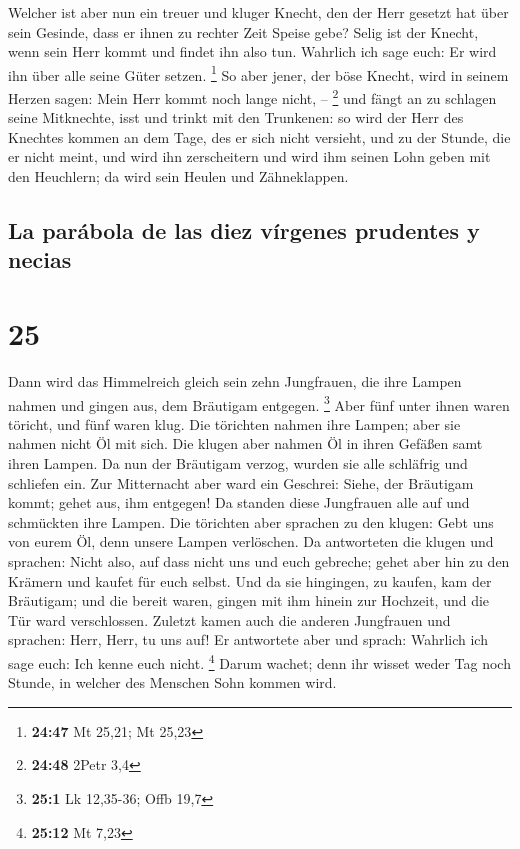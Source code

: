 Welcher ist aber nun ein treuer und kluger Knecht, den
der Herr gesetzt hat über sein Gesinde, dass er ihnen zu rechter Zeit
Speise gebe?  Selig ist der Knecht, wenn sein Herr kommt
und findet ihn also tun.  Wahrlich ich sage euch: Er wird
ihn über alle seine Güter setzen. \footnote{\textbf{24:47} Mt 25,21; Mt
  25,23}  So aber jener, der böse Knecht, wird in seinem
Herzen sagen: Mein Herr kommt noch lange nicht, -- \footnote{\textbf{24:48}
  2Petr 3,4}  und fängt an zu schlagen seine Mitknechte,
isst und trinkt mit den Trunkenen:  so wird der Herr des
Knechtes kommen an dem Tage, des er sich nicht versieht, und zu der
Stunde, die er nicht meint,  und wird ihn zerscheitern
und wird ihm seinen Lohn geben mit den Heuchlern; da wird sein Heulen
und Zähneklappen.

\hypertarget{la-paruxe1bola-de-las-diez-vuxedrgenes-prudentes-y-necias}{%
\subsection{La parábola de las diez vírgenes prudentes y
necias}\label{la-paruxe1bola-de-las-diez-vuxedrgenes-prudentes-y-necias}}

\hypertarget{section-24}{%
\section{25}\label{section-24}}

 Dann wird das Himmelreich gleich sein zehn Jungfrauen,
die ihre Lampen nahmen und gingen aus, dem Bräutigam entgegen.
\footnote{\textbf{25:1} Lk 12,35-36; Offb 19,7}  Aber fünf
unter ihnen waren töricht, und fünf waren klug.  Die
törichten nahmen ihre Lampen; aber sie nahmen nicht Öl mit sich.
 Die klugen aber nahmen Öl in ihren Gefäßen samt ihren
Lampen.  Da nun der Bräutigam verzog, wurden sie alle
schläfrig und schliefen ein.  Zur Mitternacht aber ward
ein Geschrei: Siehe, der Bräutigam kommt; gehet aus, ihm entgegen!
 Da standen diese Jungfrauen alle auf und schmückten ihre
Lampen.  Die törichten aber sprachen zu den klugen: Gebt
uns von eurem Öl, denn unsere Lampen verlöschen.  Da
antworteten die klugen und sprachen: Nicht also, auf dass nicht uns und
euch gebreche; gehet aber hin zu den Krämern und kaufet für euch selbst.
 Und da sie hingingen, zu kaufen, kam der Bräutigam; und
die bereit waren, gingen mit ihm hinein zur Hochzeit, und die Tür ward
verschlossen.  Zuletzt kamen auch die anderen Jungfrauen
und sprachen: Herr, Herr, tu uns auf!  Er antwortete aber
und sprach: Wahrlich ich sage euch: Ich kenne euch nicht. \footnote{\textbf{25:12}
  Mt 7,23}  Darum wachet; denn ihr wisset weder Tag noch
Stunde, in welcher des Menschen Sohn kommen wird.

